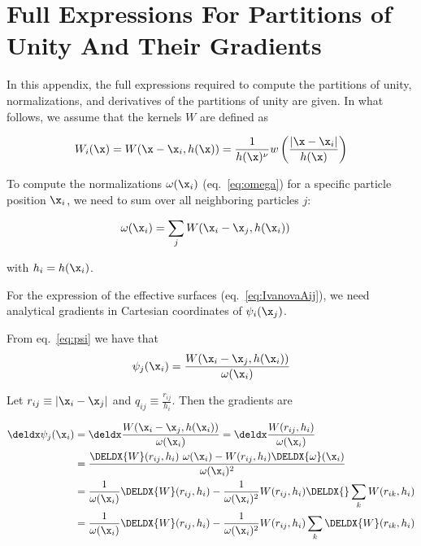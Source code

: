 \chapter{Full Expressions For Partitions of Unity And Their Gradients}
\label{app:psi-gradients-full}

In this appendix, the full expressions required to compute the partitions of unity, normalizations,
and derivatives of the partitions of unity are given. In what follows, we assume that the kernels
$W$ are defined as

\begin{align}
	W_i(\x) = W(\x - \x_i, h(\x)) = \frac{1}{h(\x)^\nu} w\left(\frac{| \x - \x_i |}{h(\x)} \right)
\end{align}


To compute the normalizations $\omega(\x_i)$ (eq.~\ref{eq:omega}) for a specific particle
position $\x_i$, we need to sum over all neighboring particles $j$:

\begin{align}
    \omega(\x_i) 	&= \sum_j W(\x_i - \x_j, h(\x_i))
\end{align}

with $h_i = h(\x_i)$.



For the \cite{ivanovaCommonEnvelopeEvolution2013} expression of the effective surfaces \Aij
(eq.~\ref{eq:IvanovaAij}), we need analytical gradients in Cartesian coordinates of $\psi_i(\x_j)$.


From eq.~\ref{eq:psi} we have that
\begin{align*}
	\psi_j(\x_i) &= \frac{ W(\x_i - \x_j, h(\x_i))}{\omega(\x_i)}\\
\end{align*}

Let $r_{ij} \equiv |\x_i - \x_j|$ and $q_{ij} \equiv \frac{r_{ij}}{h_i}$. Then the gradients are

\begin{align}
	\deldx \psi_j(\x_i) 	&= \deldx \frac{ W(\x_i - \x_j, h(\x_i))}{\omega(\x_i)}
							=  \deldx \frac{ W(r_{ij}, h_i)}{\omega(\x_i)}		\nonumber \\
%
							&= \frac{
									\DELDX{W}(r_{ij}, h_i) \  \omega(\x_i) -
									W(r_{ij}, h_i) \DELDX{\omega}(\x_i)
									}{\omega(\x_i)^2}		\nonumber  \\
%
							&= \frac{1}{\omega(\x_i)} \DELDX{W}(r_{ij}, h_i) -
							\frac{1}{\omega(\x_i)^2} W(r_{ij}, h_i) \DELDX{}\sum_k W(r_{ik}, h_i)		\nonumber \\
%
							&= \frac{1}{\omega(\x_i)} \DELDX{W}(r_{ij}, h_i) -
									\frac{1}{\omega(\x_i)^2} W(r_{ij}, h_i) \sum_k \DELDX{W}(r_{ik}, h_i)	\label{grad_psi}
\end{align}





